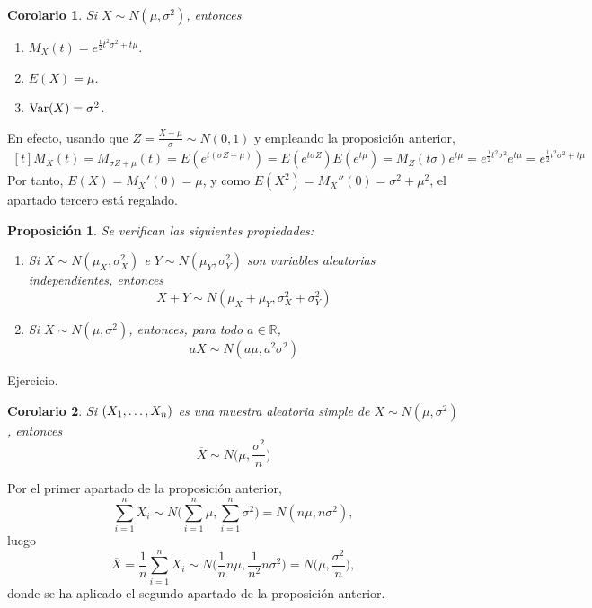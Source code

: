 \documentclass[11pt]{report}
\makeatletter
\renewenvironment{proof}[1][\proofname]{\par
  \pushQED{\qed}%
  \normalfont \topsep\z@skip %
  \trivlist
  \item[\hskip\labelsep
        \itshape
    #1\@addpunct{.}]\ignorespaces
}{%
  \popQED\endtrivlist\@endpefalse
}
\newtheorem{proposition}{Proposición}
\newtheorem{corollary}{Corolario} %
\theoremstyle{definition}
\newcommand{\R}{\mathbb R}
\makeatother
\begin{document}
\begin{corollary}
Si $X \sim N(\mu,\sigma^2)$, entonces
\begin{enumerate}
    \item $M_X(t) = e^{\frac{1}{2}t^2\sigma^2+t\mu}$.
    \item $E(X) =\mu$.
    \item $\textup{Var}(X) = \sigma^2$.
\end{enumerate}
\end{corollary}

\begin{proof}
En efecto, usando que $Z =\frac{X-\mu}{\sigma} \sim N(0,1)$ y empleando la proposición anterior,
\[
    \begin{aligned}[t]
    M_X(t) =M_{\sigma Z+\mu}(t) = E(e^{t(\sigma Z+\mu)} ) = E(e^{t\sigma Z}) E(e^{t\mu}) = M_Z(t\sigma) e^{t\mu} = e^{\frac{1}{2}t^2\sigma^2}e^{t\mu} = e^{\frac{1}{2}t^2\sigma^2+t\mu}
    \end{aligned}
    \]
Por tanto, $E(X) = M_X'(0) = \mu$, y como $E(X^2) = M_X''(0) = \sigma^2+\mu^2$, el apartado tercero está regalado.
\end{proof}

\begin{proposition}
\label{prop2.5}
Se verifican las siguientes propiedades:
\begin{enumerate}
    \item Si $X \sim N(\mu_X,\sigma^2_X)$ e $Y \sim N(\mu_Y,\sigma^2_Y)$ son variables aleatorias independientes, entonces \[X+Y \sim N(\mu_X+\mu_Y,\sigma_X^2+\sigma_Y^2)\]
    \item Si $X \sim N(\mu,\sigma^2)$, entonces, para todo $a \in \R$, \[aX \sim N(a\mu,a^2\sigma^2)\]
\end{enumerate}
\end{proposition}

\begin{proof}
    Ejercicio.
\end{proof}

\begin{corollary}
\label{cor2.6}
Si $(X_1,\mathellipsis,X_n)$ es una muestra aleatoria simple de $X \sim N(\mu,\sigma^2)$, entonces
\[\overline{X} \sim N\bigl(\mu,\frac{\sigma^2}{n}\bigr)\]
\end{corollary}

\begin{proof}
Por el primer apartado de la proposición anterior,
\[\sum_{i=1}^n X_i \sim N\bigl(\sum_{i=1}^n \mu, \sum_{i=1}^n \sigma^2 \bigr) = N(n\mu, n\sigma^2),\]
luego
\[\overline{X}= \frac{1}{n} \sum_{i=1}^n X_i \sim N\bigl(\frac{1}{n}n\mu,\frac{1}{n^2}n\sigma^2\bigr) = N\bigl(\mu, \frac{\sigma^2}{n}\bigr),\]
donde se ha aplicado el segundo apartado de la proposición anterior.
\end{proof}
\end{document}
